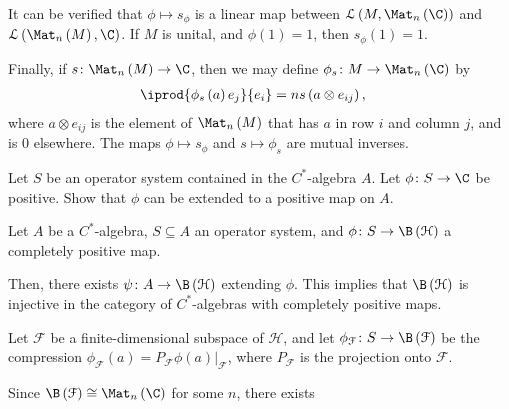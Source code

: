 \documentclass[10pt]{mypackage}
\begin{document}
It can be verified that $\phi\mapsto s_{\phi}$ is a linear map between $\mathcal{L}\left( M,\Mat_n\left( \C \right) \right)$ and $\mathcal{L}\left( \Mat_n\left( M \right),\C \right)$. If $M$ is unital, and $\phi(1) = 1$, then $s_{\phi}(1) = 1$.\newline

Finally, if $s\colon \Mat_n\left( M \right)\rightarrow \C$, then we may define $\phi_s\colon M\rightarrow \Mat_n\left( \C \right)$ by
\begin{align*}
  \iprod{\phi_s\left( a \right)e_j}{e_i} &= ns\left( a\otimes e_{ij} \right),
\end{align*}
where $a\otimes e_{ij}$ is the element of $\Mat_n\left( M \right)$ that has $a$ in row $i$ and column $j$, and is $0$ elsewhere. The maps $\phi\mapsto s_{\phi}$ and $s\mapsto \phi_s$ are mutual inverses.
\begin{exercise}
Let $S$ be an operator system contained in the $C^{\ast}$-algebra $A$. Let $\phi\colon S\rightarrow \C$ be positive. Show that $\phi$ can be extended to a positive map on $A$.
\end{exercise}

\begin{theorem}
  Let $A$ be a $C^{\ast}$-algebra, $S\subseteq A$ an operator system, and $\phi\colon S\rightarrow \B\left( \mathcal{H} \right)$ a completely positive map.\newline

  Then, there exists $\psi\colon A\rightarrow \B\left( \mathcal{H} \right)$ extending $\phi$. This implies that $\B\left( \mathcal{H} \right)$ is injective in the category of $C^{\ast}$-algebras with completely positive maps.
  \begin{center}
  \end{center}
\end{theorem}
\begin{theorem}
  Let $\mathcal{F}$ be a finite-dimensional subspace of $\mathcal{H}$, and let $\phi_{\mathcal{F}}\colon S\rightarrow \B\left( \mathcal{F} \right)$ be the compression $\phi_{\mathcal{F}}\left( a \right) = P_{\mathcal{F}}\phi(a)|_{\mathcal{F}}$, where $P_{\mathcal{F}}$ is the projection onto $\mathcal{F}$.\newline

  Since $\B\left( \mathcal{F} \right)\cong \Mat_n\left( \C \right)$ for some $n$, there exists
\end{theorem}
\end{document}

